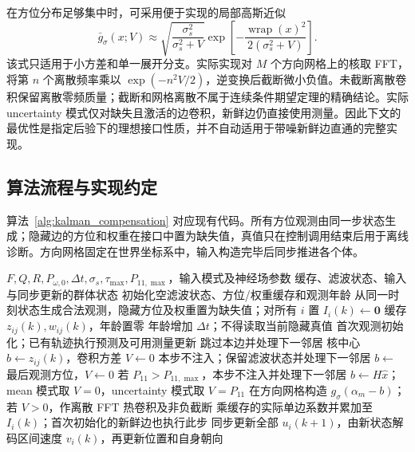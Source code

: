 \documentclass[UTF8,fontset=windows,11pt]{ctexart}
\begin{document}
在方位分布足够集中时，可采用便于实现的局部高斯近似
\begin{equation}
 \bar g_\sigma(x;V)\approx
 \sqrt{\frac{\sigma_s^2}{\sigma_s^2+V}}
 \exp\left[-\frac{\operatorname{wrap}(x)^2}{2(\sigma_s^2+V)}\right].
\end{equation}
该式只适用于小方差和单一展开分支。实际实现对 $M$ 个方向网格上的核取 FFT，将第 $n$ 个离散频率乘以 $\exp(-n^2V/2)$，逆变换后截断微小负值。未截断离散卷积保留离散零频质量；截断和网格离散不属于连续条件期望定理的精确结论。实际 uncertainty 模式仅对缺失且激活的边卷积，新鲜边仍直接使用测量。因此下文的最优性是指定后验下的理想接口性质，并不自动适用于带噪新鲜边直通的完整实现。

\subsection{算法流程与实现约定}

算法~\ref{alg:kalman_compensation} 对应现有代码。所有方位观测由同一步状态生成；隐藏边的方位和权重在接口中置为缺失值，真值只在控制调用结束后用于离线诊断。方向网格固定在世界坐标系中，输入构造完毕后同步推进各个体。

\begin{algorithm}[!tbp]
\caption{新鲜观测直通与缺失边预测输入}
\label{alg:kalman_compensation}
\small
\begin{algorithmic}[1]
\Require $F,Q,R,P_{\omega,0},\Delta t,\sigma_s,\tau_{\max},P_{11,\max}$，输入模式及神经场参数
\Ensure 缓存、滤波状态、输入与同步更新的群体状态
\State 初始化空滤波状态、方位/权重缓存和观测年龄
 \State 从同一时刻状态生成合法观测，隐藏方位及权重置为缺失值；对所有 $i$ 置 $I_i(k)\leftarrow\mathbf 0$
   \State 缓存 $z_{ij}(k),w_{ij}(k)$，年龄置零
  \Else
   \State 年龄增加 $\Delta t$；不得读取当前隐藏真值
  \EndIf
  \State 首次观测初始化；已有轨迹执行预测及可用测量更新
   \State 跳过本边并处理下一邻居
  \EndIf
   \State 核中心 $b\leftarrow z_{ij}(k)$，卷积方差 $V\leftarrow0$
   \State 本步不注入；保留滤波状态并处理下一邻居
   \State $b\leftarrow$ 最后观测方位，$V\leftarrow0$
  \Else
   \State 若 $P_{11}>P_{11,\max}$，本步不注入并处理下一邻居
   \State $b\leftarrow H\hat x$；mean 模式取 $V=0$，uncertainty 模式取 $V=P_{11}$
  \EndIf
  \State 在方向网格构造 $g_\sigma(\alpha_m-b)$；若 $V>0$，作离散 FFT 热卷积及非负截断
  \State 乘缓存的实际单边系数并累加至 $I_i(k)$；首次初始化的新鲜边也执行此步
 \EndFor
 \State 同步更新全部 $u_i(k+1)$，由新状态解码区间速度 $v_i(k)$，再更新位置和自身朝向
\EndFor
\end{algorithmic}
\end{algorithm}
\end{document}
